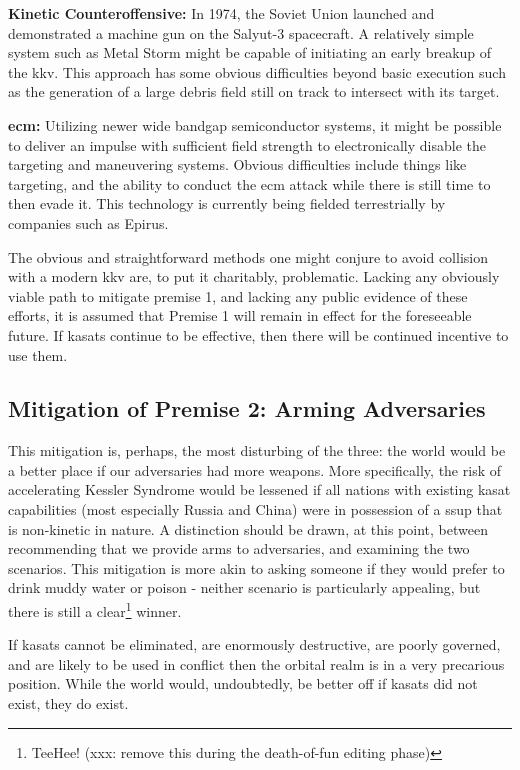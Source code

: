 \textbf{Kinetic Counteroffensive:} In 1974, the Soviet Union launched
and demonstrated a machine gun on the Salyut-3
spacecraft.\cite[p02-04]{brian} A relatively simple system such as
Metal Storm might be capable of initiating an early breakup of the
\ac{kkv}.  This approach has some obvious difficulties beyond basic
execution such as the generation of a large debris field still on
track to intersect with its target.

\textbf{\acf{ecm}:} Utilizing newer wide bandgap semiconductor
systems, it might be possible to deliver an impulse with sufficient
field strength to electronically disable the  targeting and
maneuvering systems.  Obvious difficulties include things like
targeting, and the ability to conduct the \ac{ecm} attack while there
is still time to then evade it.  This technology is currently being
fielded terrestrially by companies such as Epirus.\cite{epirus}

The obvious and straightforward methods one might conjure to avoid
collision with a modern \ac{kkv} are, to put it charitably,
problematic.  Lacking any obviously viable path to mitigate premise 1,
and lacking any public evidence of these efforts, it is assumed that
Premise 1 will remain in effect for the foreseeable future.  If
\acp{kasat} continue to be effective, then there will be continued
incentive to use them.

\subsection{Mitigation of Premise 2: Arming Adversaries}
This mitigation is, perhaps, the most disturbing of the three: the
world would be a better place if our adversaries had more weapons.
More specifically, the risk of accelerating Kessler Syndrome would be
lessened if all nations with existing \ac{kasat} capabilities (most
especially Russia and China) were in possession of a \acf{ssup} that
is non-kinetic in nature.  A distinction should be drawn, at this
point, between recommending that we provide arms to adversaries, and
examining the two scenarios.  This mitigation is more akin to asking
someone if they would prefer to drink muddy water or poison - neither
scenario is particularly appealing, but there is still a
clear\footnote{TeeHee! (xxx: remove this during the death-of-fun
editing phase)} winner.

If \acp{kasat} cannot be eliminated, are enormously destructive, are
poorly governed, and are likely to be used in conflict then the
orbital realm is in a very precarious position.  While the world
would, undoubtedly, be better off if \acp{kasat} did not exist, they
do exist.


